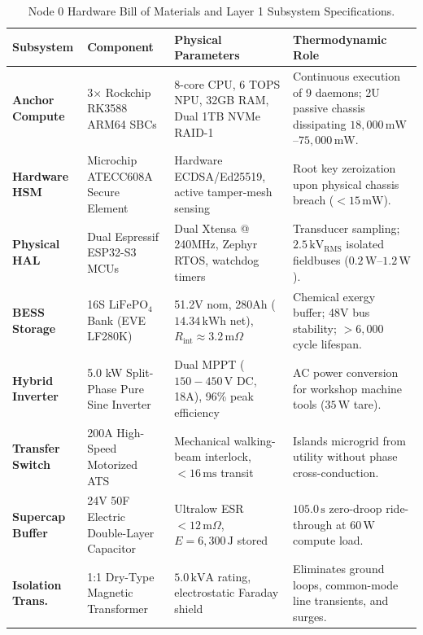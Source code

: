 \begin{table}[htbp]
\centering
\small
\setlength{\tabcolsep}{4pt}
\begin{tabular}{|p{}|p{}|p{}|p{}|}
\hline
\textbf{Subsystem} & \textbf{Component} & \textbf{Physical Parameters} & \textbf{Thermodynamic Role} \\
\hline
\textbf{Anchor Compute} & 3$\times$ Rockchip RK3588 ARM64 SBCs & 8-core CPU, 6 TOPS NPU, 32GB RAM, Dual 1TB NVMe RAID-1 & Continuous execution of 9 daemons; 2U passive chassis dissipating $18{,}000\,\mathrm{mW}$--$75{,}000\,\mathrm{mW}$. \\
\hline
\textbf{Hardware HSM} & Microchip ATECC608A Secure Element & Hardware ECDSA/Ed25519, active tamper-mesh sensing & Root key zeroization upon physical chassis breach ($<15\,\mathrm{mW}$). \\
\hline
\textbf{Physical HAL} & Dual Espressif ESP32-S3 MCUs & Dual Xtensa @ 240MHz, Zephyr RTOS, watchdog timers & Transducer sampling; $2.5\,\mathrm{kV}_{\mathrm{RMS}}$ isolated fieldbuses ($0.2\,\mathrm{W}$--$1.2\,\mathrm{W}$). \\
\hline
\textbf{BESS Storage} & 16S $\mathrm{LiFePO}_4$ Bank (EVE LF280K) & 51.2V nom, 280Ah ($14.34\,\mathrm{kWh}$ net), $R_{\mathrm{int}} \approx 3.2\,\mathrm{m}\Omega$ & Chemical exergy buffer; 48V bus stability; $>6,000$ cycle lifespan. \\
\hline
\textbf{Hybrid Inverter} & 5.0 kW Split-Phase Pure Sine Inverter & Dual MPPT ($150-450\,\mathrm{V}$ DC, 18A), 96\% peak efficiency & AC power conversion for workshop machine tools ($35\,\mathrm{W}$ tare). \\
\hline
\textbf{Transfer Switch} & 200A High-Speed Motorized ATS & Mechanical walking-beam interlock, $<16\,\mathrm{ms}$ transit & Islands microgrid from utility without phase cross-conduction. \\
\hline
\textbf{Supercap Buffer} & 24V 50F Electric Double-Layer Capacitor & Ultralow ESR $<12\,\mathrm{m}\Omega$, $E = 6,300\,\mathrm{J}$ stored & $105.0\,\mathrm{s}$ zero-droop ride-through at $60\,\mathrm{W}$ compute load. \\
\hline
\textbf{Isolation Trans.} & 1:1 Dry-Type Magnetic Transformer & $5.0\,\mathrm{kVA}$ rating, electrostatic Faraday shield & Eliminates ground loops, common-mode line transients, and surges. \\
\hline
\end{tabular}
\caption{Node 0 Hardware Bill of Materials and Layer 1 Subsystem Specifications.}
\label{tab:ch01_node0_bom}
\end{table}


